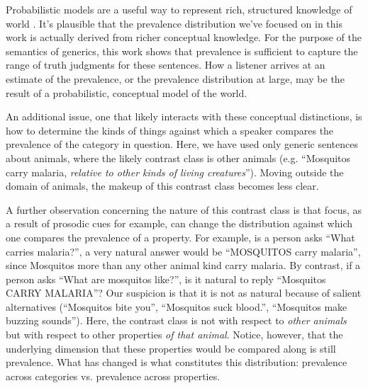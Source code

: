 \documentclass[10pt,letterpaper]{article}
\begin{document}
Probabilistic models are a useful way to represent rich, structured knowledge of world \cite{Goodmanconcepts}. It's plausible that the prevalence distribution we've focused on in this work is actually derived from richer conceptual knowledge. For the purpose of the semantics of generics, this work shows that prevalence is sufficient to capture the range of truth judgments for these sentences. How a listener arrives at an estimate of the prevalence, or the prevalence distribution at large, may be the result of a probabilistic, conceptual model of the world. 

An additional issue, one that likely interacts with these conceptual distinctions, is how to determine the kinds of things against which a speaker compares the prevalence of the category in question. Here, we have used only generic sentences about animals, where the likely contrast class is other animals (e.g. ``Mosquitos carry malaria, \emph{relative to other kinds of living creatures}''). Moving outside the domain of animals, the makeup of this contrast class becomes less clear. 

A further observation concerning the nature of this contrast class is that focus, as a result of prosodic cues for example, can change the distribution against which one compares the prevalence of a property. For example, is a person asks ``What carries malaria?'', a very natural answer would be ``MOSQUITOS carry malaria'', since Mosquitos more than any other animal kind carry malaria. By contrast, if a person asks ``What are mosquitos like?'', is it natural to reply ``Mosquitos CARRY MALARIA''? 
Our suspicion is that it is not as natural because of salient alternatives (``Mosquitos bite you'', ``Mosquitos suck blood.'', ``Mosquitos make buzzing sounds''). 
Here, the contrast class is not with respect to \emph{other animals} but with respect to other properties \emph{of that animal}. 
Notice, however, that the underlying dimension that these properties would be compared along is still prevalence. What has changed is what constitutes this distribution: prevalence across categories vs. prevalence across properties.
\end{document}
